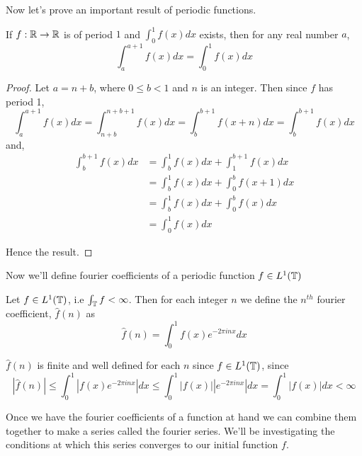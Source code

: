   Now let's prove an important result of periodic functions.
  \begin{lemma}
    \label{lem:integral_of_periodic_function}
    If $f:\mathbb R \to \mathbb R$ is of period $1$ and $\int_{0}^{1} f(x) dx$ exists, then for any real number $a$, 
    \begin{displaymath}
      \int_{a}^{a+1}f(x) dx = \int_{0}^{1} f(x) dx
    \end{displaymath} 
  \end{lemma}
  \begin{proof}
    Let $a = n +b$, where $0\le b <1$ and $n$ is an integer. Then since $f$ has period 1,
    \begin{displaymath}
      \int_{a}^{a+1}f(x) dx = \int_{n+b}^{n+b+1}f(x)dx = \int_{b}^{b+1}f(x+n)dx = \int_{b}^{b+1}f(x)dx
    \end{displaymath}
    and, 
    \begin{align*}
      \int_{b}^{b+1}f(x)dx &= \int_{b}^{1}f(x)dx + \int_{1}^{b+1}f(x)dx \\
                      &= \int_{b}^{1}f(x)dx + \int_{0}^{b}f(x+1)dx \\
                      &= \int_{b}^{1}f(x)dx + \int_{0}^{b}f(x)dx \\
                      &= \int_{0}^{1}f(x)dx
    \end{align*}

    Hence the result.
    
  \end{proof}

  Now we'll define fourier coefficients of a periodic function $f \in L^1(\mathbb T)$
  \begin{definition}
    \label{def:fourier_coefficient}
    Let $f \in L^1(\mathbb T)$, i.e $\int_{\mathbb T} f < \infty$. Then for each integer $n$ we define the $n^{th}$ fourier coefficient, $\hat{f}(n)$ as 
    \begin{displaymath}
      \hat{f}(n) = \int_0^1 f(x)e^{-2\pi inx} dx \end{displaymath}
  \end{definition}
  $\hat{f}(n)$ is finite and well defined for each $n$ since $f \in L^1(\mathbb T)$, since
  \begin{displaymath}
    |\hat{f}(n)| \le \int_0^1 |f(x)e^{-2\pi inx}| dx \le \int_0^1 |f(x)||e^{-2\pi inx}| dx = \int_0^1|f(x)| dx < \infty
  \end{displaymath}
  
  Once we have the fourier coefficients of a function at hand we can combine them together to make a series called the fourier series. We'll be investigating the conditions at which this series converges to our initial function $f$.

